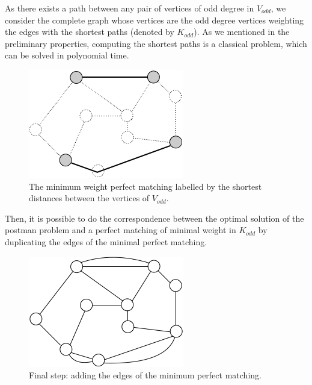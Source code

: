 {As there exists a path between any pair of vertices of odd degree in $V_{odd}$,
we consider the complete graph whose vertices are the odd degree vertices weighting the edges with the shortest paths (denoted by $K_{odd}$).
As we mentioned in the preliminary properties, computing the shortest paths is a classical problem, which can be solved in polynomial time. 

\begin{figure}[hbt]
\begin{center}
       \includegraphics[scale=0.6]{FiguresGraph/EulerienPerfectMatching}
       \caption{The minimum weight perfect matching labelled by the shortest distances between the vertices of $V_{odd}$.}
              \label{fig:Eulerianperfectmatching}
\end{center}
\end{figure}
\bigskip

Then, it is possible to do the correspondence between the optimal solution of the postman problem and a perfect matching of minimal weight in $K_{odd}$
by duplicating the edges of the minimal perfect matching.

\begin{figure}[hbt]
\begin{center}
       \includegraphics[scale=0.6]{FiguresGraph/EulerienFinal}
       \caption{Final step: adding the edges of the minimum perfect matching.}
              \label{fig:EulerianFinal}
\end{center}
\end{figure}

}
